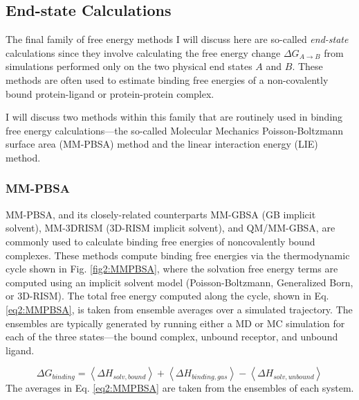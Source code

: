 \subsection{End-state Calculations}
\label{sec1:EndState}

The final family of free energy methods I will discuss here are so-called
\emph{end-state} calculations since they involve calculating the free energy
change $\Delta G_{A \rightarrow B}$ from simulations performed only on the two
physical end states $A$ and $B$. These methods are often used to estimate
binding free energies of a non-covalently bound protein-ligand or
protein-protein complex. \cite{Massova1999, Gohlke2003, Gohlke2004, Homeyer2012,
MMPBSApy}

I will discuss two methods within this family that are routinely used in binding
free energy calculations---the so-called Molecular Mechanics Poisson-Boltzmann
surface area (MM-PBSA) method \cite{Srinivasan_JAmChemSoc_1998_v120_p9401,
Massova2000} and the linear interaction energy (LIE) method.
\cite{Aqvist_ProteinEng_1994_v7_p385, Hansson1998}

\subsubsection{MM-PBSA}
\label{sec1:MMPBSA}

MM-PBSA, and its closely-related counterparts MM-GBSA (GB implicit solvent),
MM-3DRISM (3D-RISM implicit solvent), and QM/MM-GBSA, are commonly used to
calculate binding free energies of noncovalently bound complexes. These methods
compute binding free energies via the thermodynamic cycle shown in Fig.
\ref{fig2:MMPBSA}, where the solvation free energy terms are computed using an
implicit solvent model (\eg Poisson-Boltzmann, Generalized Born, or 3D-RISM).
The total free energy computed along the cycle, shown in Eq. \ref{eq2:MMPBSA},
is taken from ensemble averages over a simulated trajectory. The ensembles are
typically generated by running either a MD or MC simulation for each of the
three states---the bound complex, unbound receptor, and unbound ligand.
\cite{MMPBSApy}

\begin{equation}
   \Delta G_{binding} = \left \langle \Delta H_{solv,bound} \right \rangle +
      \left \langle \Delta H_{binding,gas} \right \rangle - \left \langle \Delta
      H_{solv, unbound} \right \rangle
   \label{eq2:MMPBSA}
\end{equation}
The averages in Eq. \ref{eq2:MMPBSA} are taken from the ensembles of each
system.

